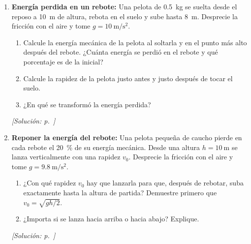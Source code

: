 \documentclass[11pt,a4paper]{book}
\begin{document}
\begin{enumerate}[label=\textbf{P\arabic*.}, ref=P\arabic*, leftmargin=*]
    \begin{enumerate}
        \item Calcule la rapidez del carro en $B$, el punto más bajo, y en la
        cima $C$.
        \item ¿Llega el carro hasta $E$, a \SI{22}{\meter}? ¿Cuál es la altura
        máxima que puede tener una colina para que el carro la supere?
        \item ¿Cambian las respuestas anteriores si el carro va lleno y tiene
        el doble de masa? Explique.
    \end{enumerate}
    \hfill\textit{[Solución: p.~\pageref{sol:parcial2-montana}]}

    \item\label{prob:parcial2-rebote} \textbf{Energía perdida en un rebote:}
    Una pelota de \SI{0.5}{\kilogram} se suelta desde el reposo a
    \SI{10}{\meter} de altura, rebota en el suelo y sube hasta
    \SI{8}{\meter}. Desprecie la fricción con el aire y tome
    $g = \SI{10}{\meter\per\second\squared}$.
    \begin{enumerate}
        \item Calcule la energía mecánica de la pelota al soltarla y en el
        punto más alto después del rebote. ¿Cuánta energía se perdió en el
        rebote y qué porcentaje es de la inicial?
        \item Calcule la rapidez de la pelota justo antes y justo después de
        tocar el suelo.
        \item ¿En qué se transformó la energía perdida?
    \end{enumerate}
    \hfill\textit{[Solución: p.~\pageref{sol:parcial2-rebote}]}

    \item\label{prob:parcial2-lanzamiento} \textbf{Reponer la energía del
    rebote:} Una pelota pequeña de caucho pierde en cada rebote el
    \SI{20}{\percent} de su energía mecánica. Desde una altura
    $h = \SI{10}{\meter}$ se lanza verticalmente con una rapidez $v_0$.
    Desprecie la fricción con el aire y tome
    $g = \SI{9.8}{\meter\per\second\squared}$.
    \begin{enumerate}
        \item ¿Con qué rapidez $v_0$ hay que lanzarla para que, después de
        rebotar, suba exactamente hasta la altura de partida? Demuestre
        primero que $v_0 = \sqrt{gh/2}$.
        \item ¿Importa si se lanza hacia arriba o hacia abajo? Explique.
    \end{enumerate}
    \hfill\textit{[Solución: p.~\pageref{sol:parcial2-lanzamiento}]}


\end{enumerate}
\end{document}
